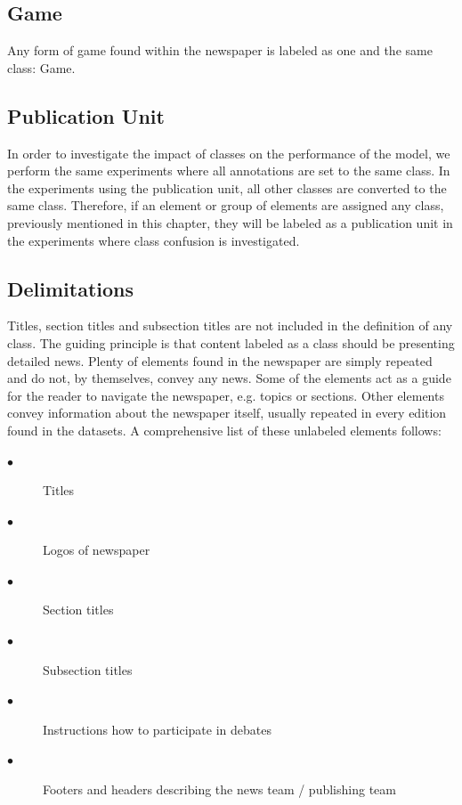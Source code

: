 \documentclass[english, bibtex]{kththesis}
\begin{document}
\subsection{Game}

Any form of game found within the newspaper is labeled as one and the same class: Game.  

\subsection{Publication Unit}

In order to investigate the impact of classes on the performance of the model, we perform the same experiments where all annotations are set to the same class. In the experiments using the publication unit, all other classes are converted to the same class. Therefore, if an element or group of elements are assigned any class, previously mentioned in this chapter, they will be labeled as a publication unit in the experiments where class confusion is investigated.

\subsection{Delimitations}

Titles, section titles and subsection titles are not included in the definition of any class. The guiding principle is that content labeled as a class should be presenting detailed news. Plenty of elements found in the newspaper are simply repeated and do not, by themselves, convey any news. Some of the elements act as a guide for the reader to navigate the newspaper, e.g. topics or sections. Other elements convey information about the newspaper itself, usually repeated in every edition found in the datasets. A comprehensive list of these unlabeled elements follows:

\begin{description}
\item[$\bullet$] Titles
\item[$\bullet$] Logos of newspaper
\item[$\bullet$] Section titles
\item[$\bullet$] Subsection titles
\item[$\bullet$] Instructions how to participate in debates
\item[$\bullet$] Footers and headers describing the news team / publishing team
\end{description}


\cleardoublepage
\end{document}
